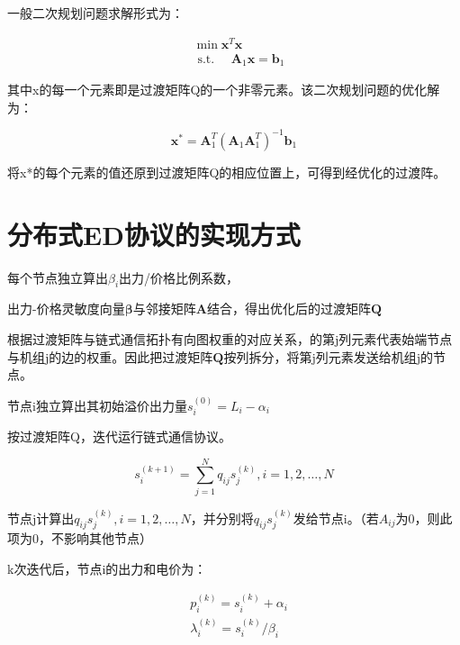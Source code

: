 一般二次规划问题求解形式为：

\begin{equation}
    \begin{aligned}
    &\min \mathbf{x}^{T} \mathbf{x}\\
    &\text { s.t. } \quad \mathbf{A}_{1} \mathbf{x}=\mathbf{b}_{1}
    \end{aligned}
\end{equation}

其中x的每一个元素即是过渡矩阵Q的一个非零元素。该二次规划问题的优化解为：

\begin{equation}
    \mathbf{x}^{*}=\mathbf{A}_{1}^{T}\left(\mathbf{A}_{1} \mathbf{A}_{1}^{T}\right)^{-1} \mathbf{b}_{1}
\end{equation}

将x*的每个元素的值还原到过渡矩阵Q的相应位置上，可得到经优化的过渡阵。

\section{分布式ED协议的实现方式}

每个节点独立算出$\beta_{i}$出力/价格比例系数，

出力-价格灵敏度向量$\boldsymbol{\beta}$与邻接矩阵$\boldsymbol{A}$结合，得出优化后的过渡矩阵$\boldsymbol{Q}$

根据过渡矩阵与链式通信拓扑有向图权重的对应关系，的第j列元素代表始端节点与机组j的边的权重。因此把过渡矩阵$\boldsymbol{Q}$按列拆分，将第j列元素发送给机组j的节点。

节点i独立算出其初始溢价出力量$s_{i}^{(0)}=L_{i}-\alpha_{i}$

按过渡矩阵Q，迭代运行链式通信协议。

\begin{equation}
    s_{i}^{(k+1)}=\sum_{j=1}^{N} q_{i j} s_{j}^{(k)}, i=1,2, \ldots, N
\end{equation}

节点j计算出$q_{i j} s_{j}^{(k)}, i=1,2, \ldots, N$，并分别将$q_{i j} s_{j}^{(k)}$发给节点i。（若$A_{i j}$为0，则此项为0，不影响其他节点）

k次迭代后，节点i的出力和电价为：

\begin{equation}
    \begin{aligned}
    &p_{i}^{(k)}=s_{i}^{(k)}+\alpha_{i}\\
    &\lambda_{i}^{(k)}=s_{i}^{(k)} / \beta_{i}
    \end{aligned}
\end{equation}

